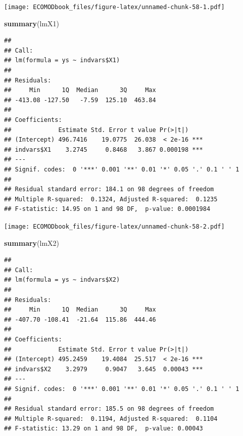 \documentclass[
]{book}
\newenvironment{Shaded}{\begin{snugshade}}{\end{snugshade}}
\newcommand{\FunctionTok}[1]{\textcolor[rgb]{0.13,0.29,0.53}{\textbf{#1}}}
\newcommand{\NormalTok}[1]{#1}
\newcommand{\OtherTok}[1]{\textcolor[rgb]{0.56,0.35,0.01}{#1}}
\newcommand{\SpecialCharTok}[1]{\textcolor[rgb]{0.81,0.36,0.00}{\textbf{#1}}}
\begin{document}
\texttt{[image: ECOMODbook\_files/figure-latex/unnamed-chunk-58-1.pdf]}

\begin{Shaded}
\begin{Highlighting}[]
\FunctionTok{summary}\NormalTok{(lmX1)}
\end{Highlighting}
\end{Shaded}

\begin{verbatim}
## 
## Call:
## lm(formula = ys ~ indvars$X1)
## 
## Residuals:
##     Min      1Q  Median      3Q     Max 
## -413.08 -127.50   -7.59  125.10  463.84 
## 
## Coefficients:
##             Estimate Std. Error t value Pr(>|t|)    
## (Intercept) 496.7416    19.0775  26.038  < 2e-16 ***
## indvars$X1    3.2745     0.8468   3.867 0.000198 ***
## ---
## Signif. codes:  0 '***' 0.001 '**' 0.01 '*' 0.05 '.' 0.1 ' ' 1
## 
## Residual standard error: 184.1 on 98 degrees of freedom
## Multiple R-squared:  0.1324, Adjusted R-squared:  0.1235 
## F-statistic: 14.95 on 1 and 98 DF,  p-value: 0.0001984
\end{verbatim}

\begin{Shaded}
\end{Shaded}

\texttt{[image: ECOMODbook\_files/figure-latex/unnamed-chunk-58-2.pdf]}

\begin{Shaded}
\begin{Highlighting}[]
\FunctionTok{summary}\NormalTok{(lmX2)}
\end{Highlighting}
\end{Shaded}

\begin{verbatim}
## 
## Call:
## lm(formula = ys ~ indvars$X2)
## 
## Residuals:
##     Min      1Q  Median      3Q     Max 
## -407.70 -108.41  -21.64  115.86  444.46 
## 
## Coefficients:
##             Estimate Std. Error t value Pr(>|t|)    
## (Intercept) 495.2459    19.4084  25.517  < 2e-16 ***
## indvars$X2    3.2979     0.9047   3.645  0.00043 ***
## ---
## Signif. codes:  0 '***' 0.001 '**' 0.01 '*' 0.05 '.' 0.1 ' ' 1
## 
## Residual standard error: 185.5 on 98 degrees of freedom
## Multiple R-squared:  0.1194, Adjusted R-squared:  0.1104 
## F-statistic: 13.29 on 1 and 98 DF,  p-value: 0.00043
\end{verbatim}
\end{document}
